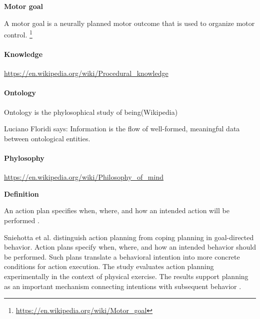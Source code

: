 \documentclass{book}
\providecommand{\ProjectDeepHeading}[2]{%
    \par\medskip\noindent\textbf{#2}\par\smallskip
}
\providecommand{\seeherefooter}[1]{\footnote{\url{#1}}}
\begin{document}
    \ProjectDeepHeading{2}{Motor goal}
        A motor goal is a neurally planned motor outcome that is used to organize motor control.
        \seeherefooter{https://en.wikipedia.org/wiki/Motor_goal}

\paragraph{Knowledge}


\url{https://en.wikipedia.org/wiki/Procedural_knowledge}

\paragraph{Ontology}


Ontology is the phylosophical study of being(Wikipedia)
        
        Luciano Floridi says:
        Information is the flow of well-formed, meaningful data between ontological entities.
        

\paragraph{Phylosophy}


\url{https://en.wikipedia.org/wiki/Philosophy_of_mind}
    


\ProjectDeepHeading{2}{Definition}
      An action plan specifies when, where, and how an intended action will be
      performed \cite{sniehotta-2006-action-plans-and-coping-plans-for-physical-exercise-a-longitudinal-intervention-study-in-cardiac-rehabilitation}.

      Sniehotta et al. distinguish action planning from coping planning in goal-directed behavior. Action plans specify when, where, and how an intended behavior should be performed. Such plans translate a behavioral intention into more concrete conditions for action execution.
      The study evaluates action planning experimentally in the context of physical exercise. The results support planning as an important mechanism connecting intentions with subsequent behavior \cite{sniehotta-2006-action-plans-and-coping-plans-for-physical-exercise-a-longitudinal-intervention-study-in-cardiac-rehabilitation}.
\end{document}
